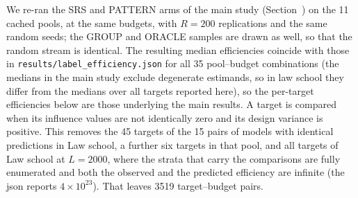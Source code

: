 We re-ran the SRS and PATTERN arms of the main study (Section~) on the 11 cached
pools, at the same budgets, with $R=200$ replications and the same random seeds; the GROUP and ORACLE
samples are drawn as well, so that the random stream is identical. The resulting median efficiencies
coincide with those in \texttt{results/label\_efficiency.json} for all 35 pool--budget
combinations (the medians in the main study exclude degenerate estimands, so in law school they differ from the medians over all targets reported here), so the per-target efficiencies below are those underlying the main results. A
target is compared when its influence values are not identically zero and its design variance is
positive. This removes the 45 targets of the 15 pairs of models with identical predictions in
Law school, a further six targets in that pool, and all targets of Law school at $L=2000$, where the
strata that carry the comparisons are fully enumerated and both the observed and the predicted
efficiency are infinite (the json reports $4\times10^{23}$). That leaves 3519 target--budget pairs.

